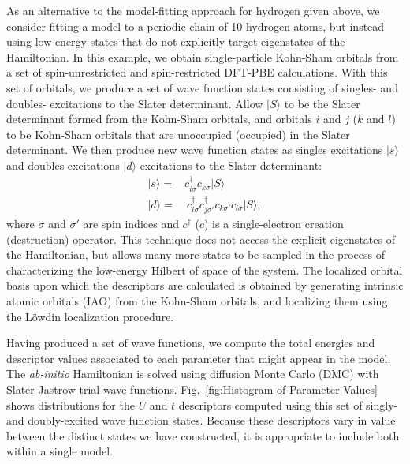 \documentclass[prl,12pt,onecolumn,nofootinbib,notitlepage,english,superscriptaddress]{revtex4-1}
\begin{document}
As an alternative to the model-fitting approach for hydrogen given above, we consider fitting a model to a periodic chain of 10 hydrogen atoms, but instead using low-energy states that do not explicitly target eigenstates of the Hamiltonian. In this example, we obtain single-particle Kohn-Sham orbitals from a set of spin-unrestricted and spin-restricted DFT-PBE calculations. With this set of orbitals, we produce a set of wave function states consisting of singles- and doubles- excitations to the Slater determinant. Allow $| S \rangle $ to be the Slater determinant formed from the Kohn-Sham orbitals, and orbitals $i$ and $j$ ($k$ and $l$) to be Kohn-Sham orbitals that are unoccupied (occupied) in the Slater determinant. We then produce new wave function states as singles excitations $|s \rangle$ and doubles excitations $| d \rangle$ excitations to the Slater determinant:
\begin{subequations}
\begin{eqnarray}
| s \rangle = & c^\dagger_{i \sigma} c_{k \sigma}   | S \rangle \\
| d \rangle = & \: c^\dagger_{i \sigma} c^\dagger_{j \sigma'} c_{k \sigma'} c_{l \sigma}   | S \rangle ,
\end{eqnarray}
\end{subequations}
where $\sigma$ and $\sigma'$ are spin indices and $c^\dagger$ ($c$) is a single-electron creation (destruction) operator. This technique does not access the explicit eigenstates of the Hamiltonian, but allows many more states to be sampled in the process of characterizing the low-energy Hilbert of space of the system. The localized orbital basis upon which the descriptors are calculated is obtained by generating intrinsic atomic orbitals (IAO) from the Kohn-Sham orbitals, and localizing them using the L\"owdin localization procedure.

Having produced a set of wave functions, we compute the total energies and descriptor values associated to each parameter that might appear in the model. The \textit{ab-initio} Hamiltonian is solved using diffusion Monte Carlo (DMC) with Slater-Jastrow trial wave functions. Fig.~\ref{fig:Histogram-of-Parameter-Values} shows distributions for the $U$ and $t$ descriptors computed using this set of singly- and doubly-excited wave function states.  Because these descriptors vary in value between the distinct states we have constructed, it is appropriate to include both within a single model.
\end{document}
